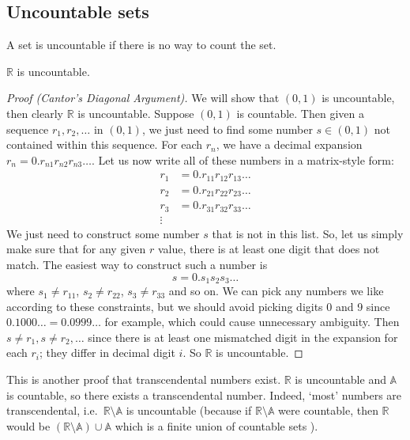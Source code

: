 \subsection{Uncountable sets}
\begin{definition}
	A set is uncountable if there is no way to count the set.
\end{definition}
\begin{theorem}
	\(\mathbb R\) is uncountable.
\end{theorem}
\begin{proof}[Proof (Cantor's Diagonal Argument)]
	We will show that \((0, 1)\) is uncountable, then clearly \(\mathbb R\) is uncountable.
	Suppose \((0, 1)\) is countable.
	Then given a sequence \(r_1, r_2, \dots\) in \((0, 1)\), we just need to find some number \(s \in (0, 1)\) not contained within this sequence.
	For each \(r_n\), we have a decimal expansion \(r_n = 0.r_{n1}r_{n2}r_{n3}\dots\).
	Let us now write all of these numbers in a matrix-style form:
	\begin{align*}
		r_1 & = 0.r_{11}r_{12}r_{13}\dots \\
		r_2 & = 0.r_{21}r_{22}r_{23}\dots \\
		r_3 & = 0.r_{31}r_{32}r_{33}\dots \\
		\vdots
	\end{align*}
	We just need to construct some number \(s\) that is not in this list.
	So, let us simply make sure that for any given \(r\) value, there is at least one digit that does not match.
	The easiest way to construct such a number is
	\[
		s = 0.s_1 s_2 s_3 \dots
	\]
	where \(s_1 \neq r_{11}\), \(s_2 \neq r_{22}\), \(s_3 \neq r_{33}\) and so on.
	We can pick any numbers we like according to these constraints, but we should avoid picking digits 0 and 9 since \(0.1000\dots = 0.0999\dots\) for example, which could cause unnecessary ambiguity.
	Then \(s \neq r_1, s \neq r_2, \dots\) since there is at least one mismatched digit in the expansion for each \(r_i\); they differ in decimal digit \(i\).
	So \(\mathbb R\) is uncountable.
\end{proof}
This is another proof that transcendental numbers exist.
\(\mathbb R\) is uncountable and \(\mathbb A\) is countable, so there exists a transcendental number.
Indeed, `most' numbers are transcendental, i.e.\ \(\mathbb R \setminus \mathbb A\) is uncountable (because if \(\mathbb R \setminus \mathbb A\) were countable, then \(\mathbb R\) would be \((\mathbb R \setminus \mathbb A) \cup \mathbb A\) which is a finite union of countable sets \contradiction).

